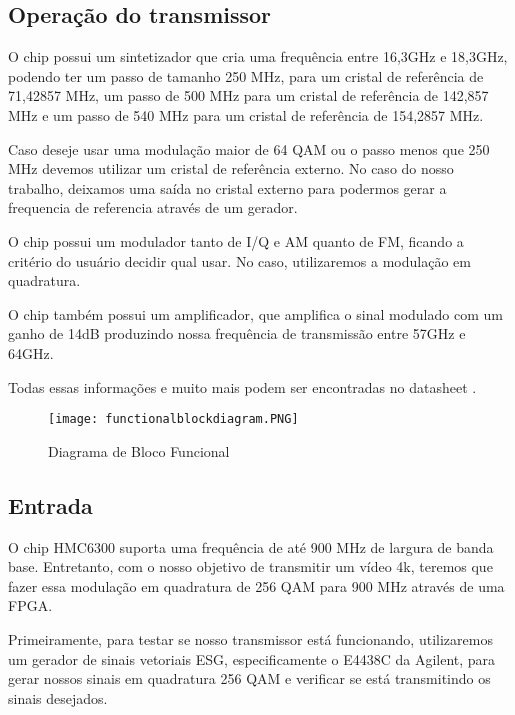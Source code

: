 \subsection{Operação do transmissor}

O chip possui um sintetizador que cria uma frequência entre 16,3GHz e 18,3GHz, podendo ter um passo de tamanho 250 MHz, para um cristal de referência de 71,42857 MHz, um passo de 500 MHz para um cristal de referência de 142,857 MHz e um passo de 540 MHz para um cristal de referência de 154,2857 MHz.

Caso deseje usar uma modulação maior de 64 QAM ou o passo menos que 250 MHz devemos utilizar um cristal de referência externo. No caso do nosso trabalho, deixamos uma saída no cristal externo para podermos gerar a frequencia de referencia através de um gerador.

O chip possui um modulador tanto de I/Q e AM quanto de FM, ficando a critério do usuário decidir qual usar. No caso, utilizaremos a modulação em quadratura. 

O chip também possui um amplificador, que amplifica o sinal modulado com um ganho de 14dB produzindo nossa frequência de transmissão entre 57GHz e 64GHz.

Todas essas informações e muito mais podem ser encontradas no datasheet \cite{hmc6300}.

\begin{figure}[htbp]
            \centering
            \caption{Diagrama de Bloco Funcional}
            \texttt{[image: functionalblockdiagram.PNG]}
            
            \centering
            \label{hmc6300}
        \end{figure}

\subsection{Entrada}

O chip HMC6300 suporta uma frequência de até 900 MHz de largura de banda base. Entretanto, com o nosso objetivo de transmitir um vídeo 4k, teremos que fazer essa modulação em quadratura de 256 QAM para 900 MHz através de uma FPGA.

Primeiramente, para testar se nosso transmissor está funcionando, utilizaremos um gerador de sinais vetoriais ESG, especificamente o E4438C da Agilent\cite{E4438C}, para gerar nossos sinais em quadratura 256 QAM e verificar se está transmitindo os sinais desejados.

